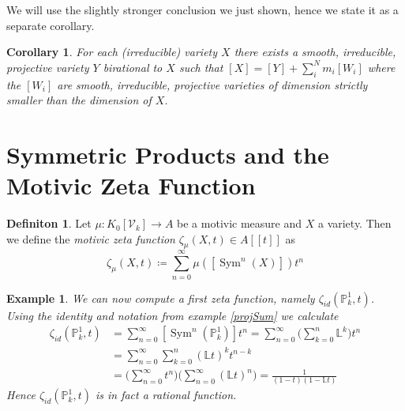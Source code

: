 \documentclass[11pt, a4paper, german]{article}
\theoremstyle{plain}
\newtheorem{corollary}[theorem]{Corollary}
\newtheorem{example}[theorem]{Example}
\theoremstyle{definition}
\newtheorem{definition}[theorem]{Definiton}
\newcommand{\gring}[1][k]{K_0[\mathcal{V}_#1]}
\DeclareMathOperator{\Sym}{Sym}
\begin{document}
We will use the slightly stronger conclusion we just shown, hence we state it as a separate corollary.

\begin{corollary}
    \label{decomp}
    For each (irreducible) variety $X$ there exists a smooth, irreducible, projective variety $Y$ birational
    to $X$ such that $[X] = [Y] + \sum_i^N m_i[W_i]$ where the $[W_i]$ are smooth, irreducible, projective varieties of dimension strictly
    smaller than the dimension of $X$.
\end{corollary}




\section{Symmetric Products and the Motivic Zeta Function}

\begin{definition}
    Let $\mu \colon \gring \to A$ be a motivic measure and $X$ a variety. Then we define the \emph{motivic zeta function} 
    $\zeta_{\mu}(X,t) \in A[[t]]$ as
    \[
        \zeta_{\mu}(X,t) \coloneqq \sum_{n=0}^\infty \mu([\Sym^n(X)])t^n
    \]
\end{definition}

\begin{example}
    We can now compute a first zeta function, namely $\zeta_{id}(\mathbb{P}_k^1, t)$. Using the identity and notation from example \ref{projSum}
    we calculate
    \begin{align*}
        \zeta_{id}(\mathbb{P}_k^1, t) & = \sum_{n=0}^\infty [\Sym^n({\mathbb{P}_k^1})]t^n 
                                       = \sum_{n=0}^\infty \big(\sum_{k=0}^n \mathbb{L}^k\big) t^n \\
                                       & = \sum_{n=0}^\infty \sum_{k=0}^n (\mathbb{L}t)^k t^{n-k} \\
                                      & = \Big( \sum_{n=0}^\infty t^n \Big) \Big( \sum_{n=0}^\infty (\mathbb{L}t)^n \Big) 
                                        = \frac{1}{(1-t)(1-\mathbb{L}t)} %
    \end{align*}
    Hence $\zeta_{id}(\mathbb{P}_k^1, t)$ is in fact a rational function.
\end{example}
\end{document}
